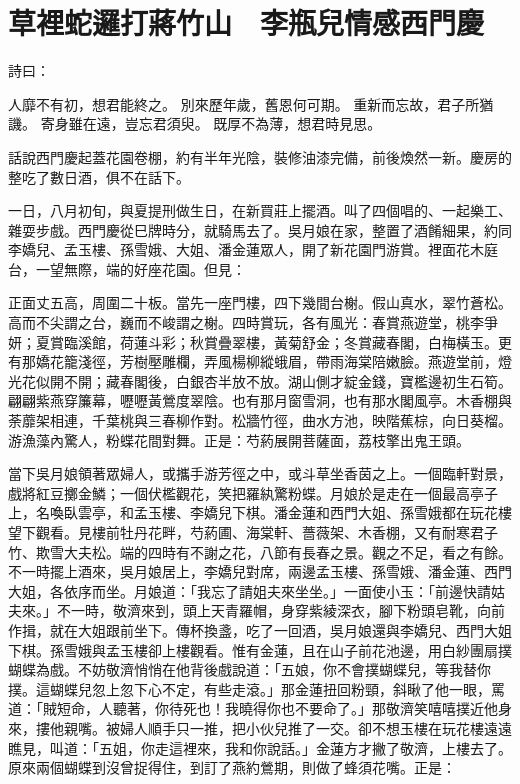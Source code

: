 %

\chapter{草裡蛇邏打蔣竹山　李瓶兒情感西門慶}

詩曰：

人靡不有初，想君能終之。
別來歷年歲，舊恩何可期。
重新而忘故，君子所猶譏。
寄身雖在遠，豈忘君須臾。
既厚不為薄，想君時見思。

話說西門慶起蓋花園卷棚，約有半年光陰，裝修油漆完備，前後煥然一新。慶房的整吃了數日酒，俱不在話下。

一日，八月初旬，與夏提刑做生日，在新買莊上擺酒。叫了四個唱的、一起樂工、雜耍步戲。西門慶從巳牌時分，就騎馬去了。吳月娘在家，整置了酒餚細果，約同李嬌兒、孟玉樓、孫雪娥、大姐、潘金蓮眾人，開了新花園門游賞。裡面花木庭台，一望無際，端的好座花園。但見：

正面丈五高，周圍二十板。當先一座門樓，四下幾間台榭。假山真水，翠竹蒼松。高而不尖謂之台，巍而不峻謂之榭。四時賞玩，各有風光：春賞燕遊堂，桃李爭妍；夏賞臨溪館，荷蓮斗彩；秋賞疊翠樓，黃菊舒金；冬賞藏春閣，白梅橫玉。更有那嬌花籠淺徑，芳樹壓雕欄，弄風楊柳縱蛾眉，帶雨海棠陪嫩臉。燕遊堂前，燈光花似開不開；藏春閣後，白銀杏半放不放。湖山側才綻金錢，寶檻邊初生石筍。翩翩紫燕穿簾幕，嚦嚦黃鶯度翠陰。也有那月窗雪洞，也有那水閣風亭。木香棚與荼蘼架相連，千葉桃與三春柳作對。松牆竹徑，曲水方池，映階蕉棕，向日葵榴。游漁藻內驚人，粉蝶花間對舞。正是：芍葯展開菩薩面，荔枝擎出鬼王頭。

當下吳月娘領著眾婦人，或攜手游芳徑之中，或斗草坐香茵之上。一個臨軒對景，戲將紅豆擲金鱗；一個伏檻觀花，笑把羅紈驚粉蝶。月娘於是走在一個最高亭子上，名喚臥雲亭，和孟玉樓、李嬌兒下棋。潘金蓮和西門大姐、孫雪娥都在玩花樓望下觀看。見樓前牡丹花畔，芍葯圃、海棠軒、薔薇架、木香棚，又有耐寒君子竹、欺雪大夫松。端的四時有不謝之花，八節有長春之景。觀之不足，看之有餘。不一時擺上酒來，吳月娘居上，李嬌兒對席，兩邊孟玉樓、孫雪娥、潘金蓮、西門大姐，各依序而坐。月娘道：「我忘了請姐夫來坐坐。」一面使小玉：「前邊快請姑夫來。」不一時，敬濟來到，頭上天青羅帽，身穿紫綾深衣，腳下粉頭皂靴，向前作揖，就在大姐跟前坐下。傳杯換盞，吃了一回酒，吳月娘還與李嬌兒、西門大姐下棋。孫雪娥與孟玉樓卻上樓觀看。惟有金蓮，且在山子前花池邊，用白紗團扇撲蝴蝶為戲。不妨敬濟悄悄在他背後戲說道：「五娘，你不會撲蝴蝶兒，等我替你撲。這蝴蝶兒忽上忽下心不定，有些走滾。」那金蓮扭回粉頸，斜瞅了他一眼，罵道：「賊短命，人聽著，你待死也！我曉得你也不要命了。」那敬濟笑嘻嘻撲近他身來，摟他親嘴。被婦人順手只一推，把小伙兒推了一交。卻不想玉樓在玩花樓遠遠瞧見，叫道：「五姐，你走這裡來，我和你說話。」金蓮方才撇了敬濟，上樓去了。原來兩個蝴蝶到沒曾捉得住，到訂了燕約鶯期，則做了蜂須花嘴。正是：

